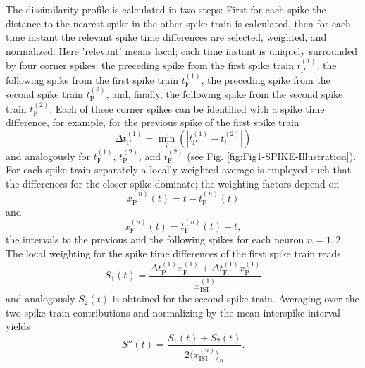 \documentclass[10pt,twocolumn]{elsart5p}
\begin{document}
The dissimilarity profile is calculated in two steps: First for each spike the distance to the nearest spike in the other spike train is calculated, then for each time instant the relevant spike time differences are selected, weighted, and normalized. Here 'relevant' means local; each time instant is uniquely surrounded by four corner spikes: the preceding spike from the first spike train $t_{\mathrm {P}}^{(1)}$, the following spike from the first spike train $t_{\mathrm {F}}^{(1)}$, the preceding spike from the second spike train $t_{\mathrm {P}}^{(2)}$, and, finally, the following spike from the second spike train $t_{\mathrm {F}}^{(2)}$. Each of these corner spikes can be identified with a spike time difference, for example, for the previous spike of the first spike train
%
\begin{equation} \label{eq:Delta-Corner-Spike}
     \Delta t_{\mathrm {P}}^{(1)} = \min_i (| t_{\mathrm {P}}^{(1)} - t_i^{(2)} |)
\end{equation}
%
and analogously for $t_{\mathrm {F}}^{(1)}$, $t_{\mathrm {P}}^{(2)}$, and $t_{\mathrm {F}}^{(2)}$  (see Fig. \ref{fig:Fig1-SPIKE-Illustration}). For each spike train separately a locally weighted average is employed such that the differences for the closer spike dominate; the weighting factors depend on
%
\begin{equation} \label{eq:Prev-Spike-Dist}
     x_{\mathrm {P}}^{(n)} (t) = t - t_{\mathrm {P}}^{(n)} (t)
\end{equation}
%
and
%
\begin{equation} \label{eq:Foll-Spike-Dist}
     x_{\mathrm {F}}^{(n)} (t) = t_{\mathrm {F}}^{(n)} (t) - t,
\end{equation}
%
the intervals to the previous and the following spikes for each neuron $n = 1, 2$. The local weighting for the spike time differences of the first spike train reads
%
\begin{equation} \label{eq:Bi-Spike-Diss-First}
     S_1 (t) = \frac{\Delta t_{\mathrm {P}}^{(1)} x_{\mathrm {F}}^{(1)} + \Delta t_{\mathrm {F}}^{(1)} x_{\mathrm {P}}^{(1)}}{x_{\mathrm {ISI}}^{(1)}}
\end{equation}
%
and analogously $S_2 (t)$ is obtained for the second spike train. Averaging over the two spike train contributions and normalizing by the mean interspike interval yields
%
\begin{equation} \label{eq:Bi-Spike-Diss-Intermediate}
     S'' (t) = \frac{S_1 (t) + S_2 (t)}{2 \langle x_{\mathrm {ISI}}^{(n)} \rangle_n}.
\end{equation}
\end{document}
